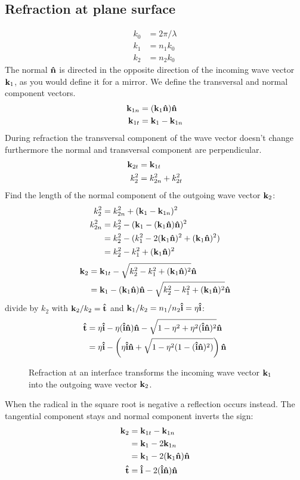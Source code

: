 \documentclass[twocolumn,DIV19]{scrartcl}
\begin{document}
\subsection{Refraction at plane surface}
\begin{align}
  k_0&=2\pi/\lambda\\
  k_1&=n_1 k_0\\
  k_2&=n_2 k_0
\end{align}
The normal $\mathbf{\hat{n}}$ is directed in the opposite direction of the incoming
wave vector $\mathbf{k}_1$, as you would define it for a mirror. We define the
transversal and normal component vectors.
\begin{align}
  \mathbf{k}_{1n}&=(\mathbf{k}_1\mathbf{\hat{n}})\mathbf{\hat{n}}\\ 
  \mathbf{k}_{1t}&=\mathbf{k}_1 - \mathbf{k}_{1n}
\end{align}
During refraction the transversal component of the wave vector doesn't
change furthermore the normal and transversal component are
perpendicular.
\begin{align}
  \mathbf{k}_{2t}&=\mathbf{k}_{1t}\\
  k_2^2&=k_{2n}^2 + k_{2t}^2
\end{align}
Find the length of the normal component of the outgoing wave vector $\mathbf{k}_2$:
\begin{align}
  k_2^2&=k_{2n}^2 + (\mathbf{k}_1 - \mathbf{k}_{1n})^2\\
  k_{2n}^2&=k_2^2-(\mathbf{k}_1-(\mathbf{k}_1\mathbf{\hat{n}})\mathbf{\hat{n}})^2\\
  &= k_2^2-(k_1^2-2(\mathbf{k}_1\mathbf{\hat{n}})^2+(\mathbf{k}_1\mathbf{\hat{n}})^2)\\
  &= k_2^2-k_1^2+(\mathbf{k}_1\mathbf{\hat{n}})^2
\end{align}
\begin{align}
  \mathbf{k}_2&=\mathbf{k}_{1t}-\sqrt{k_2^2-k_1^2+(\mathbf{k}_1\mathbf{\hat{n}})^2}\mathbf{\hat{n}}\\
  &=\mathbf{k}_1-(\mathbf{k}_1\mathbf{\hat{n}})\mathbf{\hat{n}}-\sqrt{k_2^2-k_1^2+(\mathbf{k}_1\mathbf{\hat{n}})^2}\mathbf{\hat{n}}
\end{align}
divide by $k_2$ with $\mathbf{k}_2/k_2=\mathbf{\hat{t}}$ and $\mathbf{k}_1/k_2=n_1/n_2\mathbf{\hat{i}}=\eta\mathbf{\hat{i}}$:
\begin{align}
  \mathbf{\hat{t}}&=\eta\mathbf{\hat{i}}-\eta(\mathbf{\hat{i}}\mathbf{\hat{n}})\mathbf{\hat{n}}-\sqrt{1-\eta^2+\eta^2(\mathbf{\hat{i}}\mathbf{\hat{n}})^2}\mathbf{\hat{n}}\\
  &=\eta\mathbf{\hat{i}}-\left(\eta\mathbf{\hat{i}}\mathbf{\hat{n}}+\sqrt{1-\eta^2(1-(\mathbf{\hat{i}}\mathbf{\hat{n}})^2)}\right)\mathbf{\hat{n}}
\end{align}
 \begin{figure}
   \centering
   
   \caption{Refraction at an interface transforms the incoming wave
     vector $\mathbf{k}_1$ into the outgoing wave vector $\mathbf{k}_2$.}
 \end{figure}
 When the radical in the square root is negative a reflection occurs
 instead. The tangential component stays and normal component inverts
 the sign:
 \begin{align}
   \mathbf{k}_2&=\mathbf{k}_{1t}-\mathbf{k}_{1n}\\
   &=\mathbf{k}_1 - 2\mathbf{k}_{1n}\\
   &=\mathbf{k}_1-2(\mathbf{k}_1\mathbf{\hat{n}})\mathbf{\hat{n}}\\
   \mathbf{\hat{t}}&=\mathbf{\hat{i}}-2(\mathbf{\hat{i}}\mathbf{\hat{n}})\mathbf{\hat{n}}
 \end{align}
\end{document}
